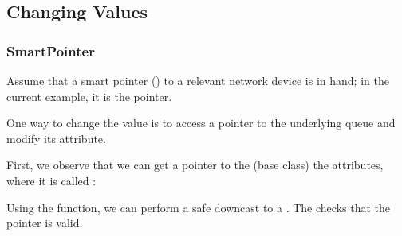 \documentclass[letterpaper,10pt,english]{sphinxmanual}
\renewcommand{\sphinxcode}[1]{\texttt{\small{#1}}}
\begin{document}
\subsection{Changing Values}
\label{\detokenize{attributes:changing-values}}

\subsubsection{SmartPointer}
\label{\detokenize{attributes:smartpointer}}
Assume that a smart pointer (\sphinxcode{}) to a relevant network device
is in hand; in the current example, it is the \sphinxcode{} pointer.

One way to change the value is to access a pointer to the underlying queue and
modify its attribute.

First, we observe that we can get a pointer to the (base class)
\sphinxcode{}  the
\sphinxcode{} attributes, where it is called
\sphinxcode{}:

\begin{sphinxVerbatim}[commandchars=\\\{\}]
 
  
      
\end{sphinxVerbatim}

Using the \sphinxcode{} function, we can perform a safe downcast
to a \sphinxcode{}.  The  checks that the pointer is
valid.

\begin{sphinxVerbatim}[commandchars=\\\{\}]
       
   
\end{sphinxVerbatim}
\end{document}
